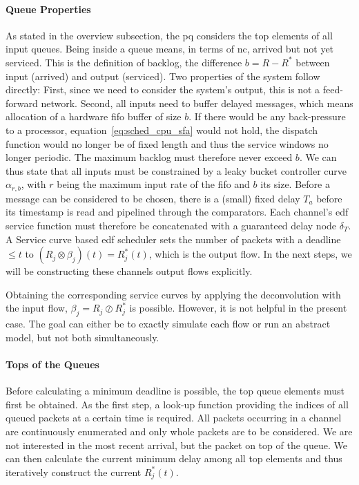 \paragraph{Queue Properties}
As stated in the overview subsection, the \gls{pq} considers the top elements of all input queues. Being inside a queue means, in terms of \gls{nc}, arrived but not yet serviced. This is the definition of backlog,
the difference $b = R - R^*$ between input (arrived) and output (serviced). Two properties of the system follow directly: First, since we need to consider the system's output, this is not a feed-forward network.
Second, all inputs need to buffer delayed messages, which means allocation of a hardware \gls{fifo} buffer of size $b$.
If there would be any back-pressure to a processor, equation~\ref{eq:sched_cpu_sfa} would not hold, the dispatch function would no longer be of fixed length and thus the service windows no longer periodic.
The maximum backlog must therefore never exceed $b$. We can thus state that all inputs must be constrained by a leaky bucket controller curve $\alpha_{r,b}$, with $r$ being the maximum input rate of the \gls{fifo} and $b$ its size.
Before a message can be considered to be chosen, there is a (small) fixed delay $T_a$ before its timestamp is read and pipelined through the comparators.
Each channel's \gls{edf} service function must therefore be concatenated with a guaranteed delay node $\delta_{T}$.
A Service curve based \gls{edf} scheduler sets the number of packets with a deadline $\le t$ to $(R_j \otimes \beta_j)(t) = R_j^*(t)$,
which is the output flow. In the next steps, we will be constructing these channels output flows explicitly.
\par
Obtaining the corresponding service curves by applying the
deconvolution with the input flow, $\beta_j = R_j \oslash R_j^*$ is possible. However, it is not helpful in the present case. The goal can either be to exactly simulate each flow or run an abstract model, but not both simultaneously.

\paragraph{Tops of the Queues}
Before calculating a minimum deadline is possible, the top queue elements must first be obtained.
As the first step, a look-up function providing the indices of all queued packets at a certain time is required.
All packets occurring in a channel are continuously enumerated and only whole packets are to be considered.
We are not interested in the most recent arrival, but the packet on top of the queue.
We can then calculate the current minimum delay among all top elements and thus iteratively construct the current $R^*_j(t)$.

